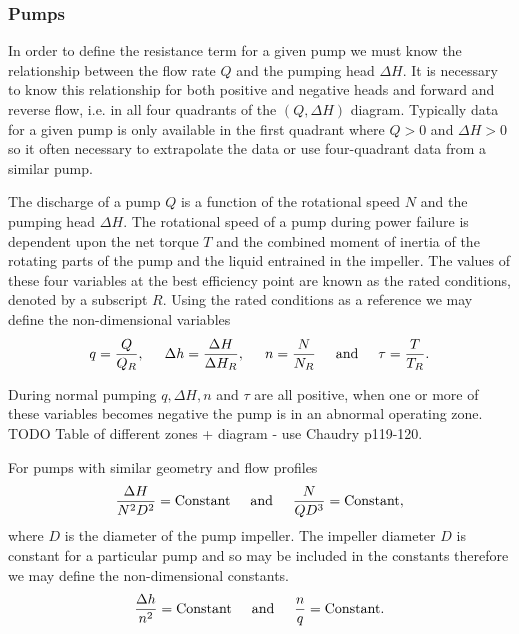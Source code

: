 \subsubsection{Pumps}

In order to define the resistance term for a given pump we must know the relationship between the flow rate $Q$ and the pumping head $\Delta H$. It is necessary to know this relationship for both positive and negative heads and forward and reverse flow, i.e. in all four quadrants of the $(Q,\Delta H)$ diagram. Typically data for a given pump is only available in the first quadrant where $Q>0$ and $\Delta H > 0$ so it often necessary to extrapolate the data or use four-quadrant data from a similar pump. 

The discharge of a pump $Q$ is a function of the rotational speed $N$ and the pumping head $\Delta H$. The rotational speed of a pump during power failure is dependent upon the net torque $T$ and the combined moment of inertia of the rotating parts of the pump and the liquid entrained in the impeller. The values of these four variables at the best efficiency point are known as the rated conditions, denoted by a subscript $R$. Using the rated conditions as a reference we may define the non-dimensional variables
\begin{align*}
q = \frac{Q}{Q_R}, \hspace{0.5cm} \Delta h = \frac{\Delta H}{\Delta H_R}, \hspace{0.5cm} n = \frac{N}{N_R} \hspace{0.5cm} \text{and} \hspace{0.5cm} \tau = \frac{T}{T_R}.
\end{align*}

During normal pumping $q, \Delta H, n$ and $\tau$ are all positive, when one or more of these variables becomes negative the pump is in an abnormal operating zone. {\color{red} TODO Table of different zones + diagram - use Chaudry p119-120}. 

For pumps with similar geometry and flow profiles 
\begin{align*}
\frac{\Delta H}{N^2 D^2} = \text{Constant} \hspace{0.5cm} \text{and} \hspace{0.5cm} \frac{N}{Q D^3} = \text{Constant},
\end{align*}  
where $D$ is the diameter of the pump impeller. The impeller diameter $D$ is constant for a particular pump and so may be included in the constants therefore we may define the non-dimensional constants. 
\begin{align*}
\frac{\Delta h}{n^2} = \text{Constant} \hspace{0.5cm} \text{and} \hspace{0.5cm} \frac{n}{q} = \text{Constant}.
\end{align*} 

